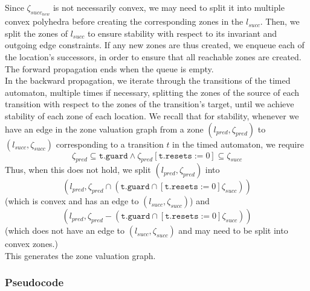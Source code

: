 \documentclass[a4paper]{llncs}
\begin{document}
Since $\zeta _{succ_{new}}$ is not necessarily convex, we may need to
split it into multiple convex polyhedra before creating the
corresponding zones in the $l_{succ}$. Then, we split the zones of
$l_{succ}$ to ensure stability with respect to
its invariant and outgoing edge constraints. If any new
zones are thus created, we enqueue each of the location's successors,
in order to ensure that all reachable zones are created. The forward
propagation ends when the queue is empty. \\

In the backward propagation, we
iterate through the transitions of the timed automaton, multiple times
if necessary, splitting the zones of the source of each transition
with respect to the zones of the transition's target, until we achieve
stability of each zone of each location. We recall that for stability,
whenever we have an edge in the zone valuation graph from a zone
$(l_{pred}, \zeta _{pred})$ to $(l_{succ}, \zeta _{succ})$
corresponding to a transition $t$ in the timed automaton, we require 
\begin{displaymath} 
  \zeta _{pred} \subseteq \texttt{t.guard}
  \wedge
  \zeta _{pred} [\texttt{t.resets} := 0] \subseteq \zeta _{succ}
\end{displaymath} 
Thus, when this does not hold, we split $(l_{pred}, \zeta _{pred})$
into
\begin{displaymath} 
  (l_{pred}, \zeta _{pred} \cap (\texttt{t.guard} \cap [\texttt{t.resets} := 0] \zeta _{succ}))
\end{displaymath} 
(which is convex and has an edge to $(l_{succ}, \zeta _{succ})$)
and
\begin{displaymath} 
  (l_{pred}, \zeta _{pred} - (\texttt{t.guard} \cap [\texttt{t.resets} := 0] \zeta _{succ}))
\end{displaymath} 
(which does not have an edge to $(l_{succ}, \zeta _{succ})$ and may
need to be split into convex zones.) \\
This generates the zone valuation graph.

\subsubsection{Pseudocode}
\end{document}
